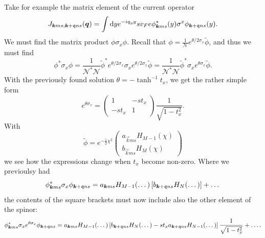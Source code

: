 Take for example the matrix element of the current operator
\[
  J_{\bm{k} m s; \bm{k}+\mathfrak{q} n s } (\bm{q}) = \int \mathrm{d}y e^{-i q_{y} y}
  s v_{F} e \phi ^{*}_{\bm{k} m s} (y) \sigma ^{x} \phi _{\bm{k} + \mathfrak{q} n s}(y).
\]
We must find the matrix product \(\phi \sigma_{x} \phi \).
Recall that \(\phi = \frac{1}{\mathcal{N}} e^{\theta /2 \sigma _{x}} \tilde{\phi} \), and thus we must find
\[
  \phi ^{*} \sigma _{x} \phi = \frac{1}{\mathcal{N}^{*} \mathcal{N}} \tilde{\phi}^{*} e^{\theta /2 \sigma _{x}} \sigma _{x} e^{\theta /2 \sigma _{x}} \tilde{\phi} =  \frac{1}{\mathcal{N}^{*} \mathcal{N}} \tilde{\phi}^{*} \sigma _{x} e^{\theta \sigma _{x}} \tilde{\phi}.
\]
With the previously found solution \(\theta = - \tanh ^{-1} t_{x}\), we get the rather simple form
\[
  e^{\theta \sigma _{x}} =
  \begin{pmatrix}
    1 & - s t_{x}\\
    -s t_{x} & 1
  \end{pmatrix}
  \frac{1}{\sqrt{1-t_{x}^2}}.
\]
With
\begin{equation}\label{eq:67}
  \tilde{\phi} = e^{-\frac{1}{2} \chi ^2}
  \begin{pmatrix}
    a_{\vec{k} m s} H_{M-1} (\chi)\\
    b_{\vec{k} m s} H_{M} (\chi)
  \end{pmatrix}
\end{equation}
we see how the expressions change when \(t_{x}\) become non-zero.
Where we previoulsy had
\begin{equation}
  \label{eq:68}
  \phi ^{*}_{\bm{k} m s} \sigma _{x} \phi _{\bm{k} + \mathfrak{q} n s}
  =
  a_{\bm{k} m s} H_{M-1}(\dots) \left[ b_{\bm{k}+\mathfrak{q} n s} H_{N}(\dots) \right]
  + \dots
\end{equation}
the contents of the square brackets must now include also the other element of the spinor:
\begin{equation}
  \label{eq:69}
  \phi ^{*}_{\bm{k} m s} \sigma _{x} e^{\theta \sigma _{x}} \phi _{\bm{k} + \mathfrak{q} n s}
  =
  a_{\bm{k} m s} H_{M-1}(\dots)
  \left[
    b_{\bm{k}+\mathfrak{q} n s} H_{N}(\dots)
    - s t_{x} a_{\bm{k} + \mathfrak{q} n s} H_{N-1} (\dots)
  \right]
  \frac{1}{\sqrt{1-t_{x}^2}}
  + \dots .
\end{equation}

